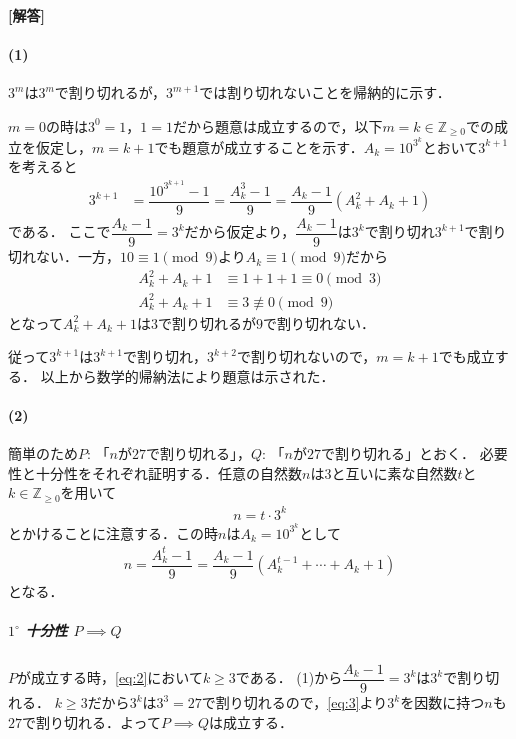 \documentclass[../../main.tex]{subfiles}
\begin{document}
\begin{oframed}
  
\end{oframed}

{\bf [解答]}
\paragraph{(1)}

$\boxed{3^m}$は$3^m$で割り切れるが，$3^{m+1}$では割り切れないことを帰納的に示す．

$m=0$の時は$3^0=1$，$\boxed{1}=1$だから題意は成立するので，以下$m=k\in\mathbb Z_{\ge0}$での成立を仮定し，$m=k+1$でも題意が成立することを示す．$A_{k}=10^{3^k}$とおいて$\boxed{3^{k+1}}$を考えると
\begin{align}
  \boxed{3^{k+1}}
  &=\dfrac{10^{3^{k+1}}-1}{9}
  =\dfrac{A_{k}^3-1}{9}
  =\dfrac{A_{k}-1}{9}(A_{k}^2+A_{k}+1) \label{eq:1}
\end{align}
である．
ここで$\dfrac{A_{k}-1}{9}=\boxed{3^k}$だから仮定より，$\dfrac{A_{k}-1}{9}$は$3^k$で割り切れ$3^{k+1}$で割り切れない．一方，$10\equiv1\pmod9$より$A_{k}\equiv1\pmod9$だから
\begin{align}
  A_{k}^2+A_{k}+1&\equiv1+1+1\equiv0\pmod3\\
  A_{k}^2+A_{k}+1&\equiv3\not\equiv0\pmod9
\end{align}
となって$A_{k}^2+A_{k}+1$は$3$で割り切れるが$9$で割り切れない．

従って$\boxed{3^{k+1}}$は$3^{k+1}$で割り切れ，$3^{k+2}$で割り切れないので，$m=k+1$でも成立する．
以上から数学的帰納法により題意は示された．

\paragraph{(2)}

簡単のため$P$: 「$n$が$27$で割り切れる」，$Q$: 「$\boxed{n}$が$27$で割り切れる」とおく．
必要性と十分性をそれぞれ証明する．任意の自然数$n$は$3$と互いに素な自然数$t$と$k\in\mathbb Z_{\ge 0}$を用いて
\begin{align}
  n=t\cdot3^k \label{eq:2}
\end{align}
とかけることに注意する．この時$\boxed{n}$は$A_{k}=10^{3^k}$として
\begin{align}
  \boxed{n}=\dfrac{A_{k}^t-1}{9}=\dfrac{A_{k}-1}{9}(A_{k}^{t-1}+\cdots+A_{k}+1) \label{eq:3}
\end{align}
となる．

\subparagraph{$1^\circ$ 十分性 $P\implies Q$}

$P$が成立する時，\cref{eq:2}において$k \ge 3$である．
(1)から$\dfrac{A_{k}-1}{9}=\boxed{3^k}$は$3^k$で割り切れる．
$k\ge3$だから$\boxed{3^k}$は$3^{3}=27$で割り切れるので，\cref{eq:3}より$\boxed{3^k}$を因数に持つ$\boxed{n}$も$27$で割り切れる．よって$P\implies Q$は成立する．
\end{document}
